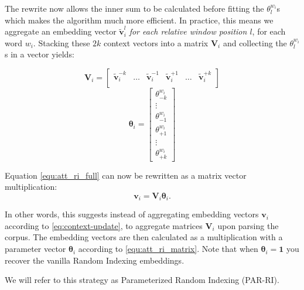 \documentclass[11pt]{article}
\begin{document}
The rewrite now allows the inner sum to be calculated before fitting the $\theta_l^{w_i}$s which makes the algorithm much more efficient. In practice, this means we aggregate an embedding vector $\tilde{\textbf{v}}_i^l$ \emph{for each relative window position $l$}, for each word $w_i$. Stacking these $2k$ context vectors into a matrix $\textbf{V}_i$ and collecting the $\theta_l^{w_i}$s in a vector yields:

\begin{equation}
    \textbf{V}_i = 
          \begin{bmatrix}
            \tilde{\textbf{v}}_i^{-k} & \ldots & \tilde{\textbf{v}}_i^{-1} & \tilde{\textbf{v}}_i^{+1} & \ldots & \tilde{\textbf{v}}_i^{+k}    \\
          \end{bmatrix}
\end{equation}
\begin{equation}
    \boldsymbol\theta_{i} =
        \begin{bmatrix}
            \theta_{-k}^{w_i} \\
            \vdots \\
            \theta_{-1}^{w_i} \\
            \theta_{+1}^{w_i} \\
            \vdots \\
            \theta_{+k}^{w_i}
        \end{bmatrix}
\end{equation}

Equation \eqref{equ:att_ri_full} can now be rewritten as a matrix vector multiplication:
\begin{equation}\label{equ:att_ri_matrix}
    \textbf{v}_i = \textbf{V}_i\boldsymbol\theta_i.
\end{equation}

In other words, this suggests instead of aggregating embedding vectors $\textbf{v}_i$ according to \eqref{eq:context-update}, to aggregate matrices $\textbf{V}_i$ upon parsing the corpus. The embedding vectors are then calculated as a multiplication with a parameter vector $\boldsymbol\theta_i$ according to \eqref{equ:att_ri_matrix}. Note that when $\boldsymbol\theta_i = \textbf{1}$ you recover the vanilla Random Indexing embeddings.

We will refer to this strategy as Parameterized Random Indexing (PAR-RI).
\end{document}
